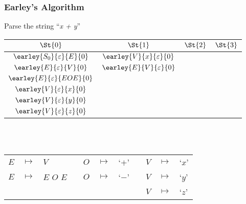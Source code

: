 \begin{frame}
	\frametitle{Earley's Algorithm}
	\centering
	Parse the string ``\emph{x + y}''\\
	\vspace{0.5cm}
	\begin{tabular}{|c|c|c|c|}
		\hline
		$\St{0}$                          & $\St{1}$ & $\St{2}$ & $\St{3}$ \\
		\hline
		$\earley{S_0}{\varepsilon}{E}{0}$ & $\earley{V}{x}{\varepsilon}{0}$   &  & \\
		$\earley{E}{\varepsilon}{V}{0}$   & $\earley{E}{V}{\varepsilon}{0}$   &  & \\
		$\earley{E}{\varepsilon}{EOE}{0}$ &                                   &  & \\
		$\earley{V}{\varepsilon}{x}{0}$   &                                   &  & \\
		$\earley{V}{\varepsilon}{y}{0}$   &                                   &  & \\
		$\earley{V}{\varepsilon}{z}{0}$   &                                   &  & \\
		\hline
	\end{tabular}

	\\~\\
	\vspace{0.5cm}
	\scriptsize
	\begin{tabular}{rclcrclcrcl}
		$E$ & $ \mapsto $ & $V$         && $O$ & $ \mapsto $ & `$+$' && $V$ & $ \mapsto $ & `$x$' \\
		$E$ & $ \mapsto $ & $E$ $O$ $E$ && $O$ & $ \mapsto $ & `$-$' && $V$ & $ \mapsto $ & `$y$' \\
		    &             &             &&     &             &       && $V$ & $ \mapsto $ & `$z$'
	\end{tabular}
\end{frame}

